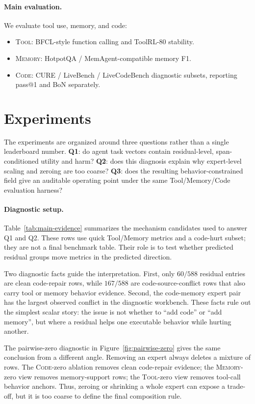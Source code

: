 \documentclass{article}
\newcommand{\tool}{\textsc{Tool}\xspace}
\newcommand{\memory}{\textsc{Memory}\xspace}
\newcommand{\code}{\textsc{Code}\xspace}
\begin{document}
\paragraph{Main evaluation.}
We evaluate tool use, memory, and code:

\begin{itemize}[leftmargin=*]
    \item \tool: BFCL-style function calling and ToolRL-80 stability.
    \item \memory: HotpotQA / MemAgent-compatible memory F1.
    \item \code: CURE / LiveBench / LiveCodeBench diagnostic subsets, reporting pass@1 and BoN separately.
\end{itemize}

\section{Experiments}

The experiments are organized around three questions rather than a single leaderboard number.  \textbf{Q1}: do agent task vectors contain residual-level, span-conditioned utility and harm?  \textbf{Q2}: does this diagnosis explain why expert-level scaling and zeroing are too coarse?  \textbf{Q3}: does the resulting behavior-constrained field give an auditable operating point under the same Tool/Memory/Code evaluation harness?

\paragraph{Diagnostic setup.}
Table~\ref{tab:main-evidence} summarizes the mechanism candidates used to answer Q1 and Q2.  These rows use quick Tool/Memory metrics and a code-hurt subset; they are not a final benchmark table.  Their role is to test whether predicted residual groups move metrics in the predicted direction.

Two diagnostic facts guide the interpretation.  First, only $60/588$ residual entries are clean code-repair rows, while $167/588$ are code-source-conflict rows that also carry tool or memory behavior evidence.  Second, the code-memory expert pair has the largest observed conflict in the diagnostic workbench.  These facts rule out the simplest scalar story: the issue is not whether to ``add code'' or ``add memory'', but where a residual helps one executable behavior while hurting another.

The pairwise-zero diagnostic in Figure~\ref{fig:pairwise-zero} gives the same conclusion from a different angle.  Removing an expert always deletes a mixture of rows.  The \code-zero ablation removes clean code-repair evidence; the \memory-zero view removes memory-support rows; the \tool-zero view removes tool-call behavior anchors.  Thus, zeroing or shrinking a whole expert can expose a trade-off, but it is too coarse to define the final composition rule.
\end{document}
